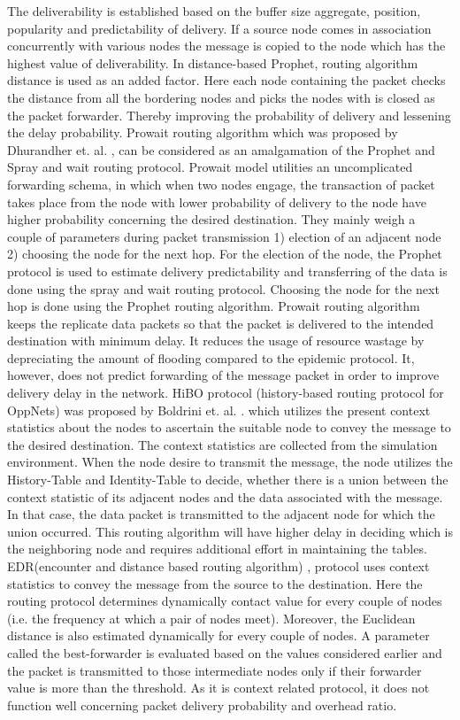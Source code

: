\documentclass[10pt,journal]{IEEEtran}
\begin{document}
The deliverability is established based on the buffer size aggregate, position, popularity and predictability of delivery. If a source node comes in association concurrently with various nodes the message is copied to the node which has the highest value of deliverability. In distance-based Prophet, routing algorithm distance is used as an added factor. Here each node containing the packet checks the distance from all the bordering nodes and picks the nodes with is closed as the packet forwarder. Thereby improving the probability of delivery and lessening the delay probability.  
Prowait routing algorithm which was proposed by Dhurandher et. al. \cite{2015pbcffon}, can be considered as an amalgamation of the Prophet and Spray and wait routing protocol. Prowait model utilities an uncomplicated forwarding schema, in which when two nodes engage, the transaction of packet takes place from the node with lower probability of delivery to the node have higher probability concerning the desired destination. They mainly weigh a couple of parameters during packet transmission  1) election of an adjacent node 2) choosing the node for the next hop. For the election of the node, the Prophet protocol is used to estimate delivery predictability and transferring of the data is done using the spray and wait routing protocol. Choosing the node for the next hop is done using the Prophet routing algorithm. Prowait routing algorithm keeps the replicate data packets so that the packet is delivered to the intended destination with minimum delay. It reduces the usage of resource wastage by depreciating the amount of flooding compared to the epidemic protocol. It, however, does not predict forwarding of the message packet in order to improve delivery delay in the network.
HiBO protocol (history-based routing protocol for OppNets) was proposed by Boldrini et. al. \cite{hibop}. which utilizes the present context statistics about the nodes to ascertain the suitable node to convey the message to the desired destination. The context statistics are collected from the simulation environment. When the node desire to transmit the message, the node utilizes the History-Table and Identity-Table to decide, whether there is a union between the context statistic of its adjacent nodes and the data associated with the message. In that case, the data packet is transmitted to the adjacent node for which the union occurred. This routing algorithm will have higher delay in deciding which is the neighboring node and requires additional effort in maintaining the tables.
EDR(encounter and distance based routing algorithm) \cite{2016edr}, protocol uses context statistics to convey the message from the source to the destination. Here the routing protocol determines dynamically contact value for every couple of nodes (i.e. the frequency at which a pair of nodes meet). Moreover, the Euclidean distance is also estimated dynamically for every couple of nodes. A  parameter called the best-forwarder is evaluated based on the values considered earlier and the packet is transmitted to those intermediate nodes only if their forwarder value is more than the threshold. As it is context related protocol, it does not function well concerning packet delivery probability and overhead ratio.
\end{document}
